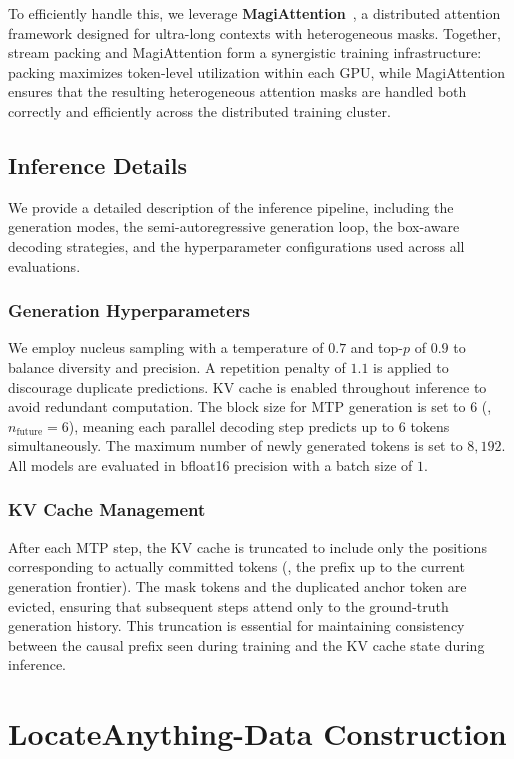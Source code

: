 To efficiently handle this, we leverage \textbf{MagiAttention}~\citep{magiattention2025}, a distributed attention framework designed for ultra-long contexts with heterogeneous masks. Together, stream packing and MagiAttention form a synergistic training infrastructure: packing maximizes token-level utilization within each GPU, while MagiAttention ensures that the resulting heterogeneous attention masks are handled both correctly and efficiently across the distributed training cluster.


\subsection{Inference Details}
We provide a detailed description of the inference pipeline, including the generation modes, the semi-autoregressive generation loop, the box-aware decoding strategies, and the hyperparameter configurations used across all evaluations.

\subsubsection{Generation Hyperparameters}
We employ nucleus sampling with a temperature of $0.7$ and top-$p$ of $0.9$ to balance diversity and precision. A repetition penalty of $1.1$ is applied to discourage duplicate predictions. KV cache is enabled throughout inference to avoid redundant computation. The block size for MTP generation is set to $6$ (\ie, $n_{\text{future}} = 6$), meaning each parallel decoding step predicts up to $6$ tokens simultaneously. The maximum number of newly generated tokens is set to $8{,}192$. All models are evaluated in bfloat16 precision with a batch size of $1$.


\subsubsection{KV Cache Management} 
After each MTP step, the KV cache is truncated to include only the positions corresponding to actually committed tokens (\ie, the prefix up to the current generation frontier). The mask tokens and the duplicated anchor token are evicted, ensuring that subsequent steps attend only to the ground-truth generation history. This truncation is essential for maintaining consistency between the causal prefix seen during training and the KV cache state during inference.


\section{LocateAnything-Data Construction}

